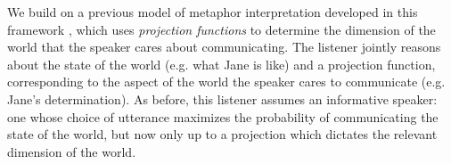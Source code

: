 \documentclass[9pt,twocolumn,twoside,lineno]{pnas-new}
\newcommand{\Listener}{L}
\newcommand{\QLONE}{\Listener_{{1}}^{{Q}}}
\begin{document}

We build on a previous model of metaphor interpretation developed in this framework \cite{kao}, which uses \emph{projection functions} to determine the dimension of the world that the speaker cares about communicating. The listener jointly reasons about the state of the world (e.g. what Jane is like) and a projection function, corresponding to the aspect of the world the speaker cares to communicate (e.g. Jane's determination). As before, this listener assumes an informative speaker: one whose choice of utterance maximizes the probability of communicating the state of the world, but now only up to a projection which dictates the relevant dimension of the world.






\end{document}
